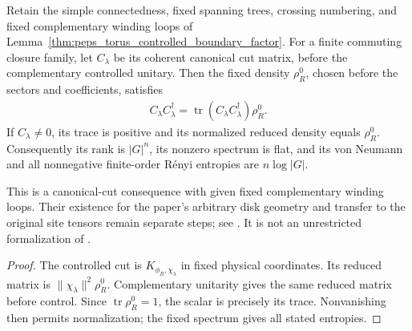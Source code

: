\begin{lemma}%
    \label{thm:peps_torus_controlled_boundary_density}
    \leanok
    Retain the simple connectedness, fixed spanning trees, crossing
    numbering, and fixed complementary winding loops of
    Lemma~\ref{thm:peps_torus_controlled_boundary_factor}. For a finite
    commuting closure family, let $C_\lambda$ be its coherent
    canonical cut matrix, before the complementary controlled unitary.
    Then the fixed density $\rho_R^0$, chosen before the sectors and
    coefficients, satisfies
    \begin{align}
        C_\lambda C_\lambda^\dagger
        =\operatorname{tr}(C_\lambda C_\lambda^\dagger)\rho_R^0.
    \end{align}
    If $C_\lambda\ne0$, its trace is positive and its normalized reduced
    density equals $\rho_R^0$. Consequently its rank is $|G|^n$, its
    nonzero spectrum is flat, and its von Neumann and all nonnegative
    finite-order R\'enyi entropies are $n\log|G|$.

    This is a canonical-cut consequence with given fixed complementary
    winding loops. Their existence for the paper's arbitrary disk geometry
    and transfer to the original site tensors remain separate steps;
    see \cite{gap:rmp_peps_quantum_double_g_isometry}. It is not an
    unrestricted formalization of \cite[Theorem~6.9]{Schuch2010PEPS}.
\end{lemma}
\begin{proof}\leanok
    The controlled cut is $K_{\phi_R,\chi_\lambda}$ in fixed physical
    coordinates. Its reduced matrix is $\|\chi_\lambda\|^2\rho_R^0$.
    Complementary unitarity gives the same reduced matrix before control.
    Since $\operatorname{tr}\rho_R^0=1$, the scalar is precisely its trace.
    Nonvanishing then permits normalization; the fixed spectrum gives all
    stated entropies.
\end{proof}

